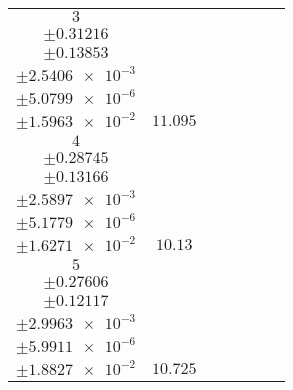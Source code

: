 \documentclass[8pt]{article}
\begin{document}
\begin{longtable}[l]{c c c c c c c}
$\num{3}$ & \begin{tabular}[c]{@{}c@{}}$\num{131}$ \\ $\pm\num{0.31216}$\end{tabular} & \begin{tabular}[c]{@{}c@{}}$\num{0.75042}$ \\ $\pm\num{0.13853}$\end{tabular} & \begin{tabular}[c]{@{}c@{}}$\num{2.7284e+3}$ \\ $\pm\num{2.5406e-3}$\end{tabular} & \begin{tabular}[c]{@{}c@{}}$\num{5.4553}$ \\ $\pm\num{5.0799e-6}$\end{tabular} & \begin{tabular}[c]{@{}c@{}}$\num{9.1136}$ \\ $\pm\num{1.5963e-2}$\end{tabular} & $\num{11.095}$\\
$\num{4}$ & \begin{tabular}[c]{@{}c@{}}$\num{119.46}$ \\ $\pm\num{0.28745}$\end{tabular} & \begin{tabular}[c]{@{}c@{}}$\num{-0.47696}$ \\ $\pm\num{0.13166}$\end{tabular} & \begin{tabular}[c]{@{}c@{}}$\num{2.7338e+3}$ \\ $\pm\num{2.5897e-3}$\end{tabular} & \begin{tabular}[c]{@{}c@{}}$\num{5.4661}$ \\ $\pm\num{5.1779e-6}$\end{tabular} & \begin{tabular}[c]{@{}c@{}}$\num{9.0167}$ \\ $\pm\num{1.6271e-2}$\end{tabular} & $\num{10.13}$\\
$\num{5}$ & \begin{tabular}[c]{@{}c@{}}$\num{124.18}$ \\ $\pm\num{0.27606}$\end{tabular} & \begin{tabular}[c]{@{}c@{}}$\num{1.5438}$ \\ $\pm\num{0.12117}$\end{tabular} & \begin{tabular}[c]{@{}c@{}}$\num{2.7431e+3}$ \\ $\pm\num{2.9963e-3}$\end{tabular} & \begin{tabular}[c]{@{}c@{}}$\num{5.4847}$ \\ $\pm\num{5.9911e-6}$\end{tabular} & \begin{tabular}[c]{@{}c@{}}$\num{7.7036}$ \\ $\pm\num{1.8827e-2}$\end{tabular} & $\num{10.725}$\\

\end{longtable}
\end{document}
